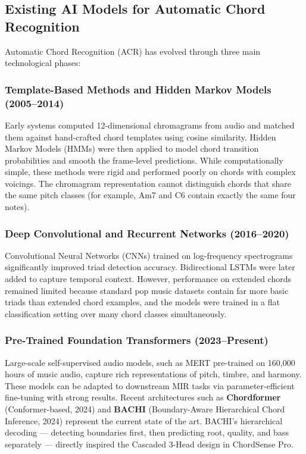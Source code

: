 \documentclass[a4paper]{article}
\begin{document}
\subsection{Existing AI Models for Automatic Chord Recognition}

Automatic Chord Recognition (ACR) has evolved through three main technological phases:

\subsubsection{Template-Based Methods and Hidden Markov Models (2005--2014)}

Early systems computed 12-dimensional chromagrams from audio and matched them against hand-crafted chord templates using cosine similarity. Hidden Markov Models (HMMs) were then applied to model chord transition probabilities and smooth the frame-level predictions. While computationally simple, these methods were rigid and performed poorly on chords with complex voicings. The chromagram representation cannot distinguish chords that share the same pitch classes (for example, Am7 and C6 contain exactly the same four notes).

\subsubsection{Deep Convolutional and Recurrent Networks (2016--2020)}

Convolutional Neural Networks (CNNs) trained on log-frequency spectrograms significantly improved triad detection accuracy. Bidirectional LSTMs were later added to capture temporal context. However, performance on extended chords remained limited because standard pop music datasets contain far more basic triads than extended chord examples, and the models were trained in a flat classification setting over many chord classes simultaneously.

\subsubsection{Pre-Trained Foundation Transformers (2023--Present)}

Large-scale self-supervised audio models, such as MERT pre-trained on 160,000 hours of music audio, capture rich representations of pitch, timbre, and harmony. These models can be adapted to downstream MIR tasks via parameter-efficient fine-tuning with strong results. Recent architectures such as \textbf{Chordformer} (Conformer-based, 2024) and \textbf{BACHI} (Boundary-Aware Hierarchical Chord Inference, 2024) represent the current state of the art. BACHI's hierarchical decoding --- detecting boundaries first, then predicting root, quality, and bass separately --- directly inspired the Cascaded 3-Head design in ChordSense Pro.
\end{document}
